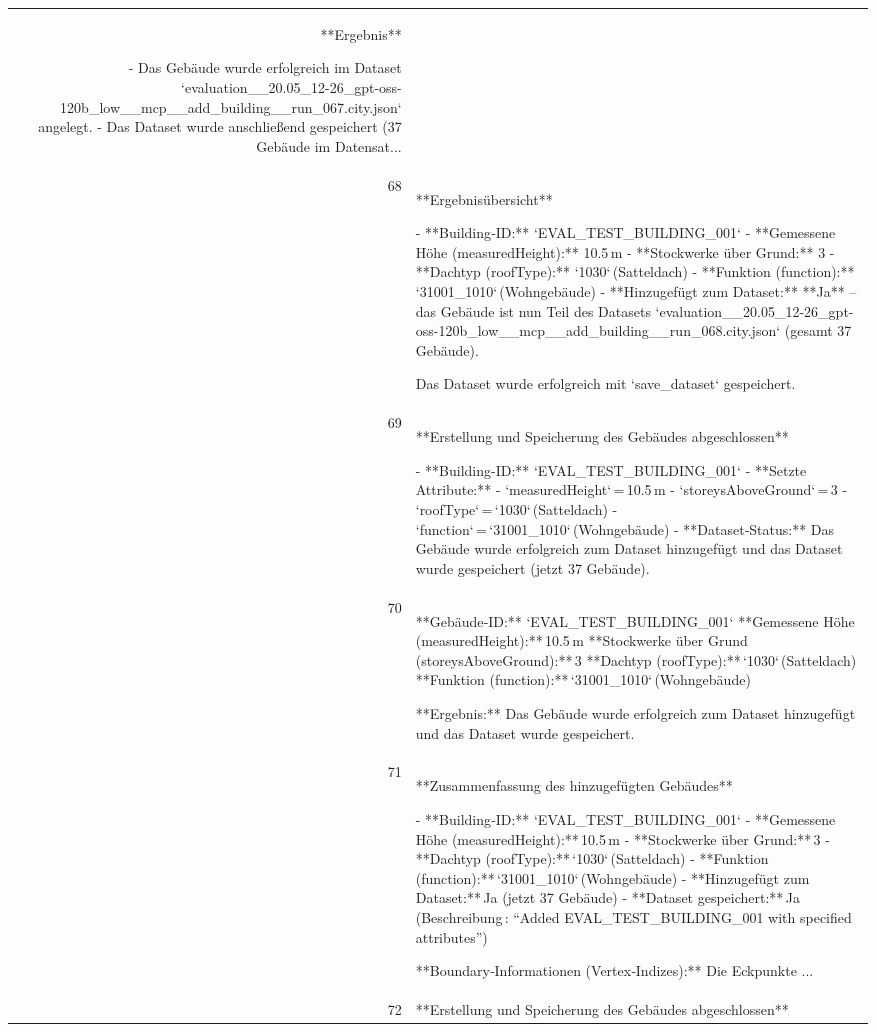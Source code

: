 \documentclass[a4paper,11pt]{article}
\begin{document}
\begin{table}[ht]
\begin{tabular}{r p{12cm}}
**Ergebnis**

- Das Gebäude wurde erfolgreich im Dataset `evaluation\_\_20.05\_12-26\_gpt-oss-120b\_low\_\_mcp\_\_add\_building\_\_run\_067.city.json` angelegt.  
- Das Dataset wurde anschließend gespeichert (37 Gebäude im Datensat... \\
68 & **Ergebnisübersicht**

- **Building‑ID:** `EVAL\_TEST\_BUILDING\_001`  
- **Gemessene Höhe (measuredHeight):** 10.5 m  
- **Stockwerke über Grund:** 3  
- **Dachtyp (roofType):** `1030` (Satteldach)  
- **Funktion (function):** `31001\_1010` (Wohngebäude)  
- **Hinzugefügt zum Dataset:** **Ja** – das Gebäude ist nun Teil des Datasets `evaluation\_\_20.05\_12-26\_gpt-oss-120b\_low\_\_mcp\_\_add\_building\_\_run\_068.city.json` (gesamt 37 Gebäude).  

Das Dataset wurde erfolgreich mit `save\_dataset` gespeichert. \\
69 & **Erstellung und Speicherung des Gebäudes abgeschlossen**

- **Building-ID:** `EVAL\_TEST\_BUILDING\_001`  
- **Setzte Attribute:**  
  - `measuredHeight` = 10.5 m  
  - `storeysAboveGround` = 3  
  - `roofType` = `1030` (Satteldach)  
  - `function` = `31001\_1010` (Wohngebäude)  
- **Dataset‑Status:** Das Gebäude wurde erfolgreich zum Dataset hinzugefügt und das Dataset wurde gespeichert (jetzt 37 Gebäude). \\
70 & **Gebäude‑ID:** `EVAL\_TEST\_BUILDING\_001`  
**Gemessene Höhe (measuredHeight):** 10.5 m  
**Stockwerke über Grund (storeysAboveGround):** 3  
**Dachtyp (roofType):** `1030` (Satteldach)  
**Funktion (function):** `31001\_1010` (Wohngebäude)  

**Ergebnis:** Das Gebäude wurde erfolgreich zum Dataset hinzugefügt und das Dataset wurde gespeichert. \\
71 & **Zusammenfassung des hinzugefügten Gebäudes**

- **Building‑ID:** `EVAL\_TEST\_BUILDING\_001`  
- **Gemessene Höhe (measuredHeight):** 10.5 m  
- **Stockwerke über Grund:** 3  
- **Dachtyp (roofType):** `1030` (Satteldach)  
- **Funktion (function):** `31001\_1010` (Wohngebäude)  
- **Hinzugefügt zum Dataset:** Ja (jetzt 37 Gebäude)  
- **Dataset gespeichert:** Ja (Beschreibung : “Added EVAL\_TEST\_BUILDING\_001 with specified attributes”)  

**Boundary‑Informationen (Vertex‑Indizes):** Die Eckpunkte ... \\
72 & **Erstellung und Speicherung des Gebäudes abgeschlossen**


\end{tabular}
\end{table}
\end{document}
